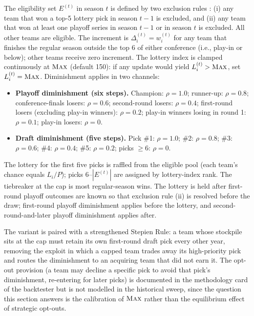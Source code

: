 \begin{definition}
\label{def:capped-cola}
The eligibility set $E^{(t)}$ in season $t$ is defined by two exclusion rules \citep{highley2026solvable5}: (i) any team that won a top-5 lottery pick in season $t-1$ is excluded, and (ii) any team that won at least one playoff series in season $t-1$ or in season $t$ is excluded. All other teams are eligible. The increment is $\Delta_i^{(t)} = w_i^{(t)}$ for any team that finishes the regular season outside the top 6 of either conference (i.e., play-in or below); other teams receive zero increment. The lottery index is clamped continuously at $\textup{\textsc{Max}}$ (default 150): if any update would yield $L_i^{(t)} > \textup{\textsc{Max}}$, set $L_i^{(t)} = \textup{\textsc{Max}}$. Diminishment applies in two channels:
\begin{itemize}
    \item \textbf{Playoff diminishment (six steps).} Champion: $\rho = 1.0$; runner-up: $\rho = 0.8$; conference-finals losers: $\rho = 0.6$; second-round losers: $\rho = 0.4$; first-round losers (excluding play-in winners): $\rho = 0.2$; play-in winners losing in round 1: $\rho = 0.1$; play-in losers: $\rho = 0$.
    \item \textbf{Draft diminishment (five steps).} Pick \#1: $\rho = 1.0$; \#2: $\rho = 0.8$; \#3: $\rho = 0.6$; \#4: $\rho = 0.4$; \#5: $\rho = 0.2$; picks $\geq 6$: $\rho = 0$.
\end{itemize}
The lottery for the first five picks is raffled from the eligible pool (each team's chance equals $L_i / P$); picks 6--$|E^{(t)}|$ are assigned by lottery-index rank. The tiebreaker at the cap is most regular-season wins. The lottery is held after first-round playoff outcomes are known so that exclusion rule (ii) is resolved before the draw; first-round playoff diminishment applies before the lottery, and second-round-and-later playoff diminishment applies after.
\end{definition}

The variant is paired with a strengthened Stepien Rule: a team whose stockpile sits at the cap must retain its own first-round draft pick every other year, removing the exploit in which a capped team trades away its high-priority pick and routes the diminishment to an acquiring team that did not earn it. The opt-out provision (a team may decline a specific pick to avoid that pick's diminishment, re-entering for later picks) is documented in the methodology card of the backtester but is not modelled in the historical sweep, since the question this section answers is the calibration of $\textup{\textsc{Max}}$ rather than the equilibrium effect of strategic opt-outs.

